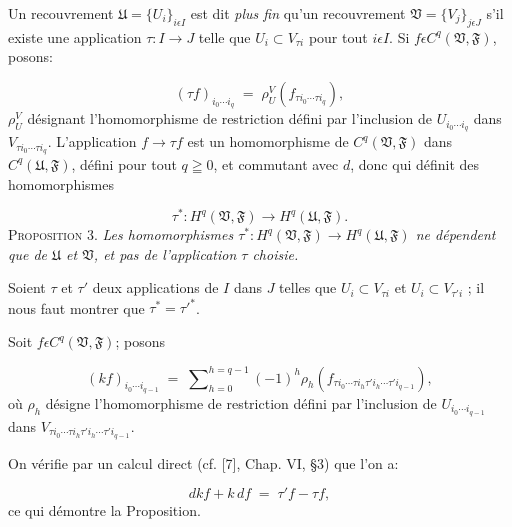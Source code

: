 Un recouvrement $\mathfrak{U} = \{U_{i}\}_{i \epsilon I}$ est dit \textit{plus fin} qu'un recouvrement $\mathfrak{V} = \{V_{j}\}_{j \epsilon J}$ s'il existe une application $\tau : I \to J$ telle que $U_{i} \subset V_{\tau i}$ pour tout $i \epsilon I$. Si $f \epsilon C^{q}(\mathfrak{V}, \mathfrak{F})$, posons:

\begin{equation*}
(\tau f)_{i_{0} \cdots i_{q}} \;=\; \rho_{U}^{V}(f_{\tau i_{0} \cdots \tau i_{q}}),
\end{equation*}
$\rho_{U}^{V}$ désignant l'homomorphisme de restriction défini par l'inclusion de $U_{i_{0} \cdots i_{q}}$ dans $V_{\tau i_{0} \cdots \tau i_{q}}$. L'application $f \to \tau f$ est un homomorphisme de $C^{q}(\mathfrak{V}, \mathfrak{F})$ dans $C^{q}(\mathfrak{U}, \mathfrak{F})$, défini pour tout $q \geqq 0$, et commutant avec $d$, donc qui définit des homomorphismes

\begin{equation*}
\tau^{*} : H^{q}(\mathfrak{V}, \mathfrak{F}) \to H^{q}(\mathfrak{U}, \mathfrak{F}).
\end{equation*}
\textsc{Proposition} 3. \textit{Les homomorphismes $\tau^{*} : H^{q}(\mathfrak{V}, \mathfrak{F}) \to H^{q}(\mathfrak{U}, \mathfrak{F})$ ne dépendent que de $\mathfrak{U}$ et $\mathfrak{V}$, et pas de l'application $\tau$ choisie.}

Soient $\tau$ et $\tau'$ deux applications de $I$ dans $J$ telles que $U_{i} \subset V_{\tau i}$ et $U_{i} \subset V_{\tau' i}$ ; il nous faut montrer que $\tau^{*} = \tau'^{*}$.

Soit $f \epsilon C^{q}(\mathfrak{V}, \mathfrak{F})$; posons

\begin{equation*}
(kf)_{i_{0} \cdots i_{q-1}} \;=\; \sum\nolimits_{h=0}^{h=q-1} (-1)^{h}\rho_{h}(f_{\tau i_{0} \cdots \tau i_{h} \tau' i_{h} \cdots \tau' i_{q-1}}),
\end{equation*}
où $\rho_{h}$ désigne l'homomorphisme de restriction défini par l'inclusion de $U_{i_{0} \cdots i_{q-1}}$ dans $V_{\tau i_{0} \cdots \tau i_{h} \tau' i_{h} \cdots \tau' i_{q-1}}$.

On vérifie par un calcul direct (cf. [7], Chap. VI, \S3) que l'on a:

\begin{equation*}
dkf + k\, df \;=\; \tau'f - \tau f,
\end{equation*}
ce qui démontre la Proposition.



